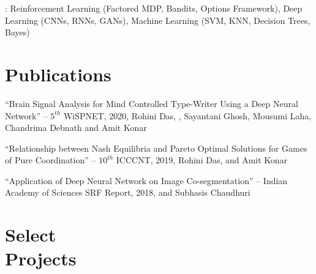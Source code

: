 \documentclass[mm]{simple_style}
\begin{document}
\begin{resume}
\vspace{-4ex}

: Reinforcement Learning (Factored MDP, Bandits, Options Framework), Deep Learning (CNNs, RNNs, GANs), Machine Learning (SVM, KNN, Decision Trees, Bayes)

\vspace{-2ex}
\sectionline


\newpage
\sectionline

\section{Publications}
``Brain Signal Analysis for Mind Controlled Type-Writer Using a Deep Neural Network'' -- $5^{th}$ WiSPNET, 2020, Rohini Das, , Sayantani Ghosh, Mousumi Laha, Chandrima Debnath and Amit Konar\\

\vspace{-4ex}

``Relationship between Nash Equilibria and Pareto Optimal Solutions for Games of Pure Coordination'' -- $10^{th}$ ICCCNT, 2019, Rohini Das,  and Amit Konar\\

\vspace{-4ex}

``Application of Deep Neural Network on Image Co-segmentation'' -- Indian Academy of Sciences SRF Report, 2018,  and Subhasis Chaudhuri

\vspace{-2ex}
\sectionline


\section{Select\\Projects}


\end{resume}
\end{document}
